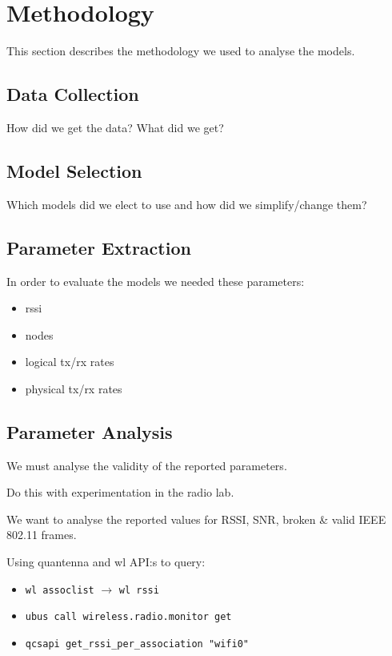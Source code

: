 \chapter{Methodology}

This section describes the methodology we used to analyse the models.

\section{Data Collection}

How did we get the data? What did we get?

\section{Model Selection}

Which models did we elect to use and how did we simplify/change them?

\section{Parameter Extraction}

In order to evaluate the models we needed these parameters:

\begin{itemize}
\item rssi
\item nodes
\item logical tx/rx rates
\item physical tx/rx rates
\end{itemize}

\section{Parameter Analysis}

We must analyse the validity of the reported parameters.

Do this with experimentation in the radio lab.

We want to analyse the reported values for RSSI, SNR, broken \& valid IEEE 802.11 frames.

Using quantenna and wl API:s to query:
\begin{itemize}
    \item \texttt{wl assoclist} $\rightarrow$ \texttt{wl rssi}
    \item \texttt{ubus call wireless.radio.monitor get}
    \item \texttt{qcsapi get\_rssi\_per\_association "wifi0"}
\end{itemize}
